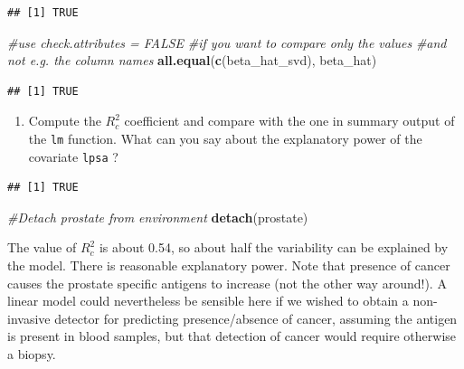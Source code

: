 \documentclass[]{book}
\newenvironment{Shaded}{\begin{snugshade}}{\end{snugshade}}
\newcommand{\KeywordTok}[1]{\textcolor[rgb]{0.13,0.29,0.53}{\textbf{#1}}}
\newcommand{\DecValTok}[1]{\textcolor[rgb]{0.00,0.00,0.81}{#1}}
\newcommand{\StringTok}[1]{\textcolor[rgb]{0.31,0.60,0.02}{#1}}
\newcommand{\CommentTok}[1]{\textcolor[rgb]{0.56,0.35,0.01}{\textit{#1}}}
\newcommand{\OperatorTok}[1]{\textcolor[rgb]{0.81,0.36,0.00}{\textbf{#1}}}
\newcommand{\NormalTok}[1]{#1}
\providecommand{\tightlist}{%
  \setlength{\itemsep}{0pt}\setlength{\parskip}{0pt}}
\theoremstyle{definition}
\theoremstyle{definition}
\theoremstyle{definition}
\theoremstyle{remark}
\begin{document}
\begin{verbatim}
## [1] TRUE
\end{verbatim}

\begin{Shaded}
\begin{Highlighting}[]
\CommentTok{#use check.attributes = FALSE }
\CommentTok{#if you want to compare only the values}
\CommentTok{#and not e.g. the column names}
\KeywordTok{all.equal}\NormalTok{(}\KeywordTok{c}\NormalTok{(beta_hat_svd), beta_hat)}
\end{Highlighting}
\end{Shaded}

\begin{verbatim}
## [1] TRUE
\end{verbatim}

\begin{enumerate}
\def\labelenumi{\roman{enumi}.}
\tightlist
\item
  Compute the \(R^2_c\) coefficient and compare with the one in summary
  output of the \texttt{lm} function. What can you say about the
  explanatory power of the covariate \texttt{lpsa} ?
\end{enumerate}

\begin{Shaded}
\end{Shaded}

\begin{verbatim}
## [1] TRUE
\end{verbatim}

\begin{Shaded}
\begin{Highlighting}[]
\CommentTok{#Detach prostate from environment}
\KeywordTok{detach}\NormalTok{(prostate)}
\end{Highlighting}
\end{Shaded}

The value of \(R^2_c\) is about 0.54, so about half the variability can
be explained by the model. There is reasonable explanatory power. Note
that presence of cancer causes the prostate specific antigens to
increase (not the other way around!). A linear model could nevertheless
be sensible here if we wished to obtain a non-invasive detector for
predicting presence/absence of cancer, assuming the antigen is present
in blood samples, but that detection of cancer would require otherwise a
biopsy.
\end{document}
